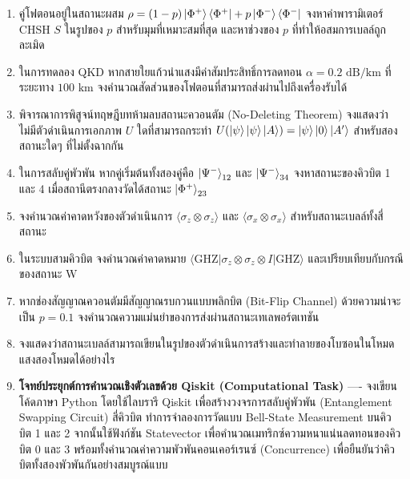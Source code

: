 \begin{enumerate}[label=\textbf{\arabic*.}]
    \item คู่โฟตอนอยู่ในสถานะผสม $\rho = (1-p)\ket{\Phi^+}\bra{\Phi^+} + p\ket{\Phi^-}\bra{\Phi^-}$ จงหาค่าพารามิเตอร์ CHSH $S$ ในรูปของ $p$ สำหรับมุมที่เหมาะสมที่สุด และหาช่วงของ $p$ ที่ทำให้อสมการเบลล์ถูกละเมิด
    \item ในการทดลอง QKD หากสายใยแก้วนำแสงมีค่าสัมประสิทธิ์การลดทอน $\alpha = 0.2\text{ dB/km}$ ที่ระยะทาง $100\text{ km}$ จงคำนวณสัดส่วนของโฟตอนที่สามารถส่งผ่านไปถึงเครื่องรับได้
    \item พิจารณาการพิสูจน์ทฤษฎีบทห้ามลบสถานะควอนตัม (No-Deleting Theorem) จงแสดงว่าไม่มีตัวดำเนินการเอกภาพ $U$ ใดที่สามารถกระทำ $U(\ket{\psi}\ket{\psi}\ket{A}) = \ket{\psi}\ket{0}\ket{A'}$ สำหรับสองสถานะใดๆ ที่ไม่ตั้งฉากกัน
    \item ในการสลับคู่พัวพัน หากคู่เริ่มต้นทั้งสองคู่คือ $\ket{\Psi^-}_{12}$ และ $\ket{\Psi^-}_{34}$ จงหาสถานะของคิวบิต 1 และ 4 เมื่อสถานีตรงกลางวัดได้สถานะ $\ket{\Phi^+}_{23}$
    \item จงคำนวณค่าคาดหวังของตัวดำเนินการ $\langle \sigma_z \otimes \sigma_z \rangle$ และ $\langle \sigma_x \otimes \sigma_x \rangle$ สำหรับสถานะเบลล์ทั้งสี่สถานะ
    \item ในระบบสามคิวบิต จงคำนวณค่าคาดหมาย $\langle \text{GHZ} | \sigma_z \otimes \sigma_z \otimes I | \text{GHZ} \rangle$ และเปรียบเทียบกับกรณีของสถานะ W
    \item หากช่องสัญญาณควอนตัมมีสัญญาณรบกวนแบบพลิกบิต (Bit-Flip Channel) ด้วยความน่าจะเป็น $p = 0.1$ จงคำนวณความแม่นยำของการส่งผ่านสถานะเทเลพอร์ตเทชัน
    \item จงแสดงว่าสถานะเบลล์สามารถเขียนในรูปของตัวดำเนินการสร้างและทำลายของโบซอนในโหมดแสงสองโหมดได้อย่างไร
    \item \textbf{โจทย์ประยุกต์การคำนวณเชิงตัวเลขด้วย Qiskit (Computational Task)} ---- จงเขียนโค้ดภาษา Python โดยใช้ไลบรารี Qiskit เพื่อสร้างวงจรการสลับคู่พัวพัน (Entanglement Swapping Circuit) สี่คิวบิต ทำการจำลองการวัดแบบ Bell-State Measurement บนคิวบิต 1 และ 2 จากนั้นใช้ฟังก์ชัน Statevector เพื่อคำนวณเมทริกซ์ความหนาแน่นลดทอนของคิวบิต 0 และ 3 พร้อมทั้งคำนวณค่าความพัวพันคอนเคอร์เรนซ์ (Concurrence) เพื่อยืนยันว่าคิวบิตทั้งสองพัวพันกันอย่างสมบูรณ์แบบ
\end{enumerate}

